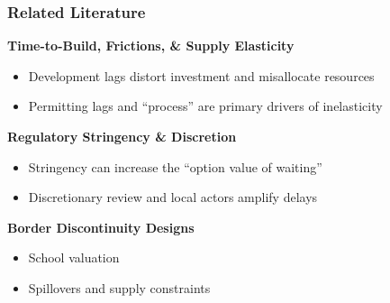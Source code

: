 \begin{frame}[shrink=5]
    \frametitle{Related Literature}

    \textbf{Time-to-Build, Frictions, \& Supply Elasticity}
    \begin{itemize}[itemsep=2pt, topsep=3pt]
        \item Development lags distort investment and misallocate resources \cite{budish_firms_2015,hsieh_housing_2019}
        \item Permitting lags and ``process'' are primary drivers of inelasticity \cite{paciorek_supply_2013, gyourko_local_2021, molloy_housing_2022,soltas_how_2026}
    \end{itemize}

    \vspace{2pt}
    \textbf{Regulatory Stringency \& Discretion}
    \begin{itemize}[itemsep=2pt, topsep=3pt]
        \item Stringency can increase the ``option value of waiting'' \cite{cunningham_house_2006, bloom_impact_2009}
        \item Discretionary review and local actors amplify delays \cite{fischel_homevoter_2009, ortalo-magne_political_2014,einstein_neighborhood_2019,khan_decentralized_2021,duranton_urban_2023}
    \end{itemize}

    \vspace{2pt}
    \textbf{Border Discontinuity Designs}
    \begin{itemize}[itemsep=2pt, topsep=3pt]
        \item School valuation \citep{black_better_1999, bayer_unified_2007}
        \item Spillovers and supply constraints \citep{turner_land_2014, diamond_effects_2019, kulka_under_2026}
    \end{itemize}
\end{frame}
